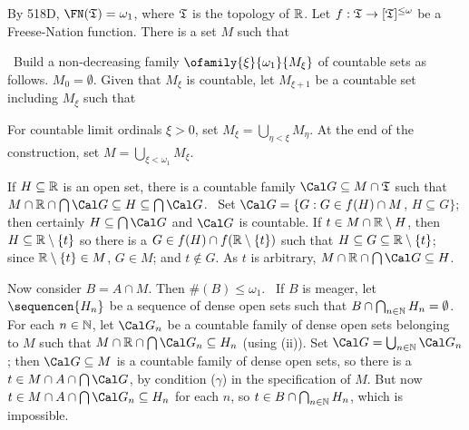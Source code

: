 {\medskip

 By 518D, $\FN(\frak T)=\omega_1$, where $\frak T$ is the
topology of $\Bbb R$.   Let $f:\frak T\to[\frak T]^{\le\omega}$ be a
Freese-Nation function.   There is a set $M$ such that


\noindent\Prf\ Build a non-decreasing family
$\ofamily{\xi}{\omega_1}{M_{\xi}}$ of countable sets as follows.
$M_0=\emptyset$.   Given that $M_{\xi}$ is countable, let $M_{\xi+1}$
be a countable set including $M_{\xi}$ such that


\noindent For countable limit ordinals $\xi>0$, set
$M_{\xi}=\bigcup_{\eta<\xi}M_{\eta}$.   At the end of the construction,
set $M=\bigcup_{\xi<\omega_1}M_{\xi}$.\ \Qed

\medskip

 If $H\subseteq\Bbb R$ is an open set, there is a
countable family $\Cal G\subseteq M\cap\frak T$ such that
$M\cap\Bbb R\cap\bigcap\Cal G\subseteq H\subseteq\bigcap\Cal G$.   \Prf\
Set $\Cal G=\{G:G\in f(H)\cap M$, $H\subseteq G\}$;  then certainly
$H\subseteq\bigcap\Cal G$ and $\Cal G$ is countable.   If
$t\in M\cap\Bbb R\setminus H$, then $H\subseteq\Bbb R\setminus\{t\}$ so
there is a $G\in f(H)\cap f(\Bbb R\setminus\{t\})$ such that
$H\subseteq G\subseteq\Bbb R\setminus\{t\}$;  since
$\Bbb R\setminus\{t\}\in M$,
$G\in M$;  and $t\notin G$.   As $t$ is arbitrary,
$M\cap\Bbb R\cap\bigcap\Cal G\subseteq H$.\ \Qed

\medskip

 Now consider $B=A\cap M$.   Then $\#(B)\le\omega_1$.
\Quer\ If $B$ is meager, let $\sequencen{H_n}$ be a sequence of dense
open sets such that $B\cap\bigcap_{n\in\Bbb N}H_n=\emptyset$.   For each
$n\in\Bbb N$, let $\Cal G_n$ be a countable family of dense open sets
belonging to $M$ such that
$M\cap\Bbb R\cap\bigcap\Cal G_n\subseteq H_n$ (using (ii)).   Set
$\Cal G=\bigcup_{n\in\Bbb N}\Cal G_n$;  then $\Cal G\subseteq M$ is a
countable family of dense open sets, so there is a
$t\in M\cap A\cap\bigcap\Cal G$, by condition ($\gamma$) in the
specification of $M$.   But now
$t\in M\cap A\cap\bigcap\Cal G_n\subseteq H_n$ for each $n$, so
$t\in B\cap\bigcap_{n\in\Bbb N}H_n$, which is impossible.\ \Bang

}
